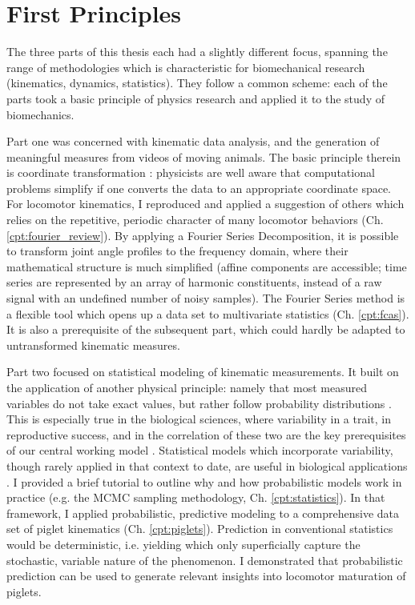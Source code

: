 \section{First Principles}
\label{sec:orgb2dd2c1}
The three parts of this thesis each had a slightly different focus, spanning the range of methodologies which is characteristic for biomechanical research (kinematics, dynamics, statistics).
They follow a common scheme:
each of the parts took a basic principle of physics research and applied it to the study of biomechanics.


Part one was concerned with kinematic data analysis, and the generation of meaningful measures from videos of moving animals.
The basic principle therein is coordinate transformation \citep{Tipler2007}: physicists are well aware that computational problems simplify if one converts the data to an appropriate coordinate space.
For locomotor kinematics, I reproduced and applied a suggestion of others \citep{Bernstein1927a,Webb2007} which relies on the repetitive, periodic character of many locomotor behaviors (Ch. \ref{cpt:fourier_review}).
By applying a Fourier Series Decomposition, it is possible to transform joint angle profiles to the frequency domain, where their mathematical structure is much simplified (affine components are accessible; time series are represented by an array of harmonic constituents, instead of a raw signal with an undefined number of noisy samples).
The Fourier Series method is a flexible tool which opens up a data set to multivariate statistics (Ch. \ref{cpt:fcas}).
It is also a prerequisite of the subsequent part, which could hardly be adapted to untransformed kinematic measures.

\medskip
Part two focused on statistical modeling of kinematic measurements.
It built on the application of another physical principle: namely that most measured variables do not take exact values, but rather follow probability distributions \citep{2022Probability}.
This is especially true in the biological sciences, where variability in a trait, in reproductive success, and in the correlation of these two are the key prerequisites of our central working model \citep{Darwin1859}.
Statistical models which incorporate variability, though rarely applied in that context to date, are useful in biological applications \citep{Roraas2019,DeGroote2021}.
I provided a brief tutorial to outline why and how probabilistic models work in practice (e.g. the MCMC sampling methodology, Ch. \ref{cpt:statistics}).
In that framework, I applied probabilistic, predictive modeling to a comprehensive data set of piglet kinematics (Ch. \ref{cpt:piglets}).
Prediction in conventional statistics would be deterministic, i.e. yielding  which only superficially capture the stochastic, variable nature of the phenomenon.
I demonstrated that probabilistic prediction can be used to generate relevant insights into locomotor maturation of piglets.

